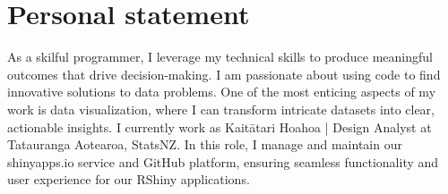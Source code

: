 \section{Personal statement}
As a skilful programmer, I leverage my technical skills to produce meaningful outcomes that drive decision-making. 
I am passionate about using code to find innovative solutions to data problems.
One of the most enticing aspects of my work is data visualization, where I can transform intricate datasets into clear, actionable insights. 
I currently work as Kaitātari Hoahoa | Design Analyst at Tatauranga Aotearoa, StatsNZ. In this role, I manage and maintain our shinyapps.io service and GitHub platform, ensuring seamless functionality and user experience for our RShiny applications.